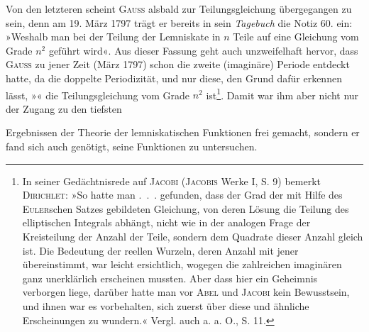 Von den letzteren scheint \textsc{Gauss} alsbald zur Teilungsgleichung übergegangen
zu sein, denn am 19. März 1797 trägt er bereits in sein \textit{Tagebuch} die Notiz
60. ein: »Weshalb man bei der Teilung der Lemniskate in \(n\) Teile auf eine
Gleichung vom Grade \(n^2\) geführt wird«. Aus dieser Fassung geht auch unzweifelhaft
hervor, dass \textsc{Gauss} zu jener Zeit (März 1797) schon die zweite
(imaginäre) Periode entdeckt hatte, da die doppelte Periodizität, und nur diese,
den Grund dafür erkennen lässt, »« die Teilungsgleichung vom
Grade \(n^2\) ist\footnote{In seiner Gedächtnisrede auf \textsc{Jacobi} (\textsc{Jacobis} Werke I, S. 9) bemerkt \textsc{Dirichlet}: »So hatte
man .\ .\ . gefunden, dass der Grad der mit Hilfe des \textsc{Euler}schen Satzes gebildeten Gleichung, von deren
Lösung die Teilung des elliptischen Integrals abhängt, nicht wie in der analogen Frage der Kreisteilung
der Anzahl der Teile, sondern dem Quadrate dieser Anzahl gleich ist. Die Bedeutung der reellen Wurzeln,
deren Anzahl mit jener übereinstimmt, war leicht ersichtlich, wogegen die zahlreichen imaginären ganz unerklärlich
erscheinen mussten. Aber dass hier ein Geheimnis verborgen liege, darüber hatte man vor \textsc{Abel}
und \textsc{Jacobi} kein Bewusstsein, und ihnen war es vorbehalten, sich zuerst über diese und ähnliche Erscheinungen
zu wundern.« Vergl. auch a. a. O., S. 11.}. Damit war ihm aber nicht nur der Zugang zu den tiefsten\par
\clearpage{}
\noindent Ergebnissen der Theorie der lemniskatischen Funktionen frei gemacht, sondern
er fand sich auch genötigt, seine Funktionen  zu untersuchen.

